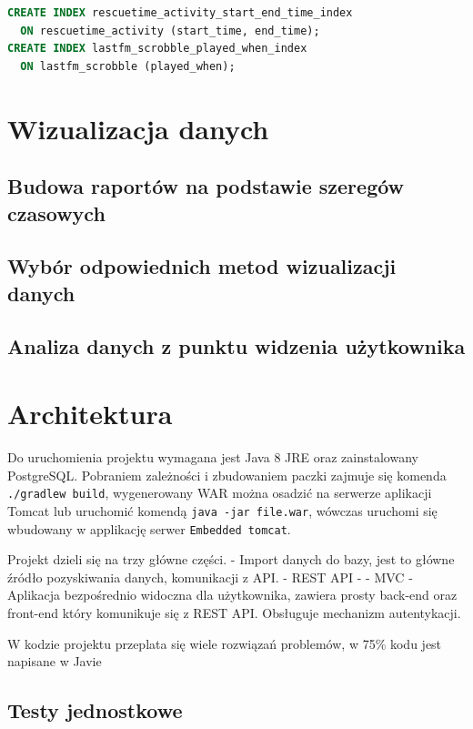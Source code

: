 \documentclass[brudnopis]{xmgr}
\begin{document}
\begin{lstlisting}[language=sql]
CREATE INDEX rescuetime_activity_start_end_time_index
  ON rescuetime_activity (start_time, end_time);
CREATE INDEX lastfm_scrobble_played_when_index
  ON lastfm_scrobble (played_when);
\end{lstlisting}

\chapter{Wizualizacja danych}

    \section{Budowa raportów na podstawie szeregów czasowych}

    \section{Wybór odpowiednich metod wizualizacji danych}

    \section{Analiza danych z punktu widzenia użytkownika}

\chapter{Architektura}

    Do uruchomienia projektu wymagana jest Java 8 JRE oraz zainstalowany PostgreSQL.
    Pobraniem zależności i zbudowaniem paczki zajmuje się komenda \verb|./gradlew build|,
    wygenerowany WAR można osadzić na serwerze aplikacji Tomcat lub uruchomić komendą \verb|java -jar file.war|,
    wówczas uruchomi się wbudowany w applikację serwer \verb|Embedded tomcat|.

    Projekt dzieli się na trzy główne części.
    - Import danych do bazy, jest to główne źródło pozyskiwania danych, komunikacji z API.
    - REST API - %
    - MVC - Aplikacja bezpośrednio widoczna dla użytkownika, zawiera prosty back-end oraz front-end który komunikuje się z REST API.
    Obsługuje mechanizm autentykacji.

    W kodzie projektu przeplata się wiele rozwiązań problemów, w 75\% kodu jest napisane w Javie

\section{Testy jednostkowe}
\end{document}
